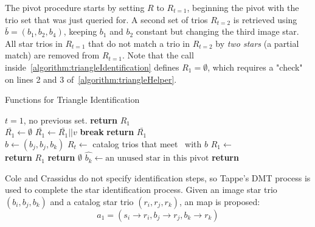 The pivot procedure starts by setting $R$ to $R_{t=1}$, beginning the pivot with the trio set that was just queried
for.
A second set of trios $R_{t=2}$ is retrieved using $\bar{b} = (b_1, b_2, b_4)$, keeping $b_1$ and $b_2$ constant
but changing the third image star.
All star trios in $R_{t=1}$ that do not match a trio in $R_{t=2}$ by \textit{two stars} (a partial match) are removed
from $R_{t=1}$.
Note that the  call inside~\autoref{algorithm:triangleIdentification}
defines $R_1 = \emptyset$, which requires a "check" on lines 2 and 3 of~\autoref{algorithm:triangleHelper}.

\begin{algorithm}
    \caption{Functions for Triangle Identification} \label{algorithm:triangleHelper}
    \begin{algorithmic}[1]
         \Comment $t = 1$, no previous set.
        \State \textbf{return} $R_1$
        \EndIf
        \\
        \State $\bar{R_1} \gets \emptyset$
        \State $\bar{R_1} \gets \bar{R_1} || v$
        \State \textbf{break}
        \EndIf
        \EndFor
        \EndFor
        \State \textbf{return} $\bar{R_1}$
        \EndFunction
        \\
        \State $b \gets (b_j, b_j, b_k)$
        \State $R_t \gets $ catalog trios that meet~ with $b$
        \State $R_1 \gets $ 
        \\
        \State \textbf{return} $R_1$
        \State \textbf{return} $\emptyset$
        \Else
        \State $\hat{b_k} \gets \text{an unused star in this pivot}$
        \State \textbf{return} 
        \EndIf
        \EndFunction
    \end{algorithmic}
\end{algorithm}

Cole and Crassidus do not specify identification steps, so Tappe's DMT process is used to complete the star
identification process.
Given an image star trio $(b_i, b_j, b_k)$ and a catalog star trio $(r_i, r_j, r_k)$, an map is proposed:
\begin{equation}
    a_1 = (s_i \rightarrow r_i, b_j \rightarrow r_j, b_k \rightarrow r_k)
\end{equation}


